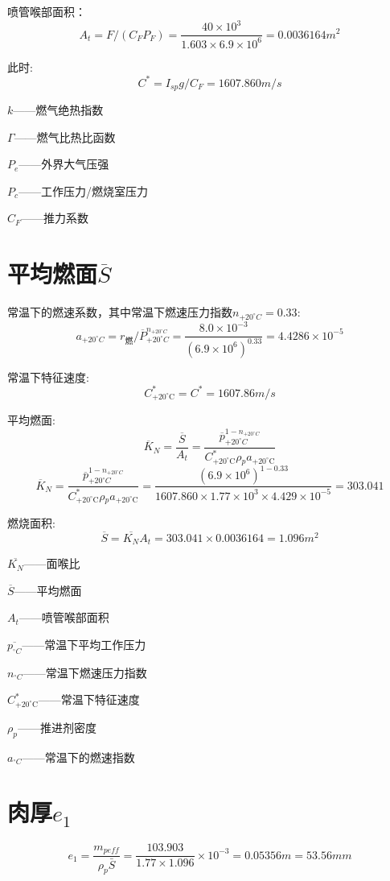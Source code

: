 喷管喉部面积：
\[
  A_t=F/\left( C_FP_F \right) =\frac{40\times 10^3}{1.603\times 6.9\times 10^6}=0.0036164m^2
\]

此时:
\[
  C^*=I_{sp}g/C_F=1607.860m/s
\]

$k$——燃气绝热指数

$\Gamma$——燃气比热比函数

$P_{e}$——外界大气压强

$P_{c}$——工作压力/燃烧室压力

$C_{F}$——推力系数

\section{平均燃面$\overline{S}$}

常温下的燃速系数，其中常温下燃速压力指数$n_{+20^\circ C}=0.33$:
\[
a_{+20^{\circ}C}=r_{\text{燃}}/\overline{P}_{+20^\circ C}^{n_{+20^\circ C}}=\frac{8.0\times 10^{-3}}{\left( 6.9\times 10^{6} \right) ^{0.33}}=4.4286\times 10^{-5}
\]

常温下特征速度:
\[
  C_{+20^{\circ}\mathrm{C}}^{*}=C^*=1607.86m/s
\]

平均燃面:
\[
\overline{K}_N=\frac{\overline{S}}{A_t}=\frac{\overline{p}_{+20^\circ C}^{1-n_{+20^\circ C}}}{C_{{+20^{\circ}\mathrm{C}}}^{*}\rho {_p}a_{+20^{\circ}\mathrm{C}}}
\]
\[
  \overline{K}_N=\frac{\overline{p}_{+20^\circ C}^{1-n_{+20^\circ C}}}{C_{{+20^{\circ}\mathrm{C}}}^{*}\rho {_p}a_{+20^{\circ}\mathrm{C}}}=\frac{(6.9\times 10^6)^{1-0.33}}{1607.860\times 1.77\times 10^3\times 4.429\times 10^{-5}}=303.041
\]

燃烧面积:
\[
  \overline{S}=\overline{K_N}A_t=303.041\times 0.0036164=1.096m^{2}
\]

$\overline{K_N}$——面喉比

$\overline{S}$——平均燃面

$A_{t}$——喷管喉部面积

$\overline{p_{^\circ C}}$——常温下平均工作压力

$n_{^\circ C}$——常温下燃速压力指数

$C_{+20^{\circ}\mathrm{C}}^{*}$——常温下特征速度

$\rho_{p}$——推进剂密度

$a_{^\circ C}$——常温下的燃速指数

\section{肉厚$e_{1}$}
\[
e_1=\frac{m_{peff}}{\rho _p\bar{S}}=\frac{103.903}{1.77\times 1.096}\times 10^{-3}=0.05356m=53.56mm
\]

